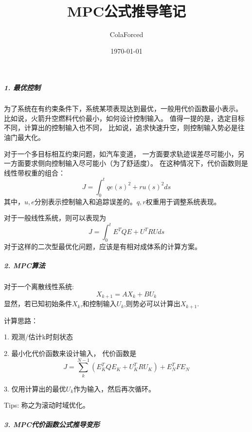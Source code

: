 \documentclass[UTF8,a4paper,10pt]{ctexart}
\title{\textbf{MPC公式推导笔记}}
\author{ ColaForced}
\date{\today}
\begin{document}
    \maketitle
 
 


\subparagraph{1. 最优控制}

    为了系统在有约束条件下，系统某项表现达到最优，一般用代价函数最小表示。
    比如说，火箭升空燃料代价最小，如何设计控制输入。
    值得一提的是，选定目标不同，计算出的控制输入也不同，
    比如说，追求快速升空，则控制输入势必是往油门最大化。

    对于一个多目标相互约束问题，如汽车变道，
    一方面要求轨迹误差尽可能小，另一方面要求侧向控制输入尽可能小（为了舒适度）。
    在这种情况下，代价函数则是线性带权重的组合：
    \begin{equation}
        J = \int_{0}^{t}qe(s)^2 + ru(s)^2ds
    \end{equation}\label{model}
    其中，$u,e$分别表示控制输入和追踪误差的。$q,r$权重用于调整系统表现。

    对于一般线性系统，则可以表现为
        \begin{equation}
            J = \int_{0}^{t}E^TQE + U^TRUds
        \end{equation}
    对于这样的二次型最优化问题，应该是有相对成体系的计算方案。

\subparagraph{2. MPC算法}

    对于一个离散线性系统:
        \begin{equation}\label{model}
            X_{k+1} = AX_{k} + BU_{k}
        \end{equation}
    显然，若已知初始条件$X_{k}$,和控制输入$U_{k}$,则势必可以计算出$X_{k+1}$.

    
    计算思路：

        1. 观测/估计k时刻状态
        
        2. 最小化代价函数来设计输入， 代价函数是 
        \begin{equation}
            J = \sum_{k}^{N-1}({E_{K}^T Q E_{K} + U_{K}^T R U_{K}}) + E_N^TFE_N
        \end{equation}

        3. 仅用计算出的最优$U_k$作为输入，然后再次循环。
    
    Tips: 称之为滚动时域优化。

\subparagraph{3. MPC代价函数公式推导变形}
\end{document}
